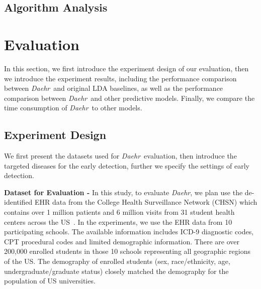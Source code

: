 \documentclass[journal,compsoc]{IEEEtran}
\newcommand{\TheName}{\mbox{\emph{Daehr}}}
\begin{document}
\subsection{Algorithm Analysis}
\section{Evaluation}\label{sec:5}
In this  section, we first introduce the experiment design of our evaluation, then we introduce the experiment results, including the performance comparison between \TheName\ and original LDA baselines, as well as the performance comparison between \TheName\ and other predictive models. Finally, we compare the time consumption of \TheName\ to other models.



\subsection{Experiment Design}
We first present the datasets used for \TheName\ evaluation, then introduce the targeted diseases for the early detection, further we specify the settings of early detection.

\textbf{Dataset for Evaluation - } In this study, to evaluate \TheName, we plan use the de-identified EHR data from the College Health Surveillance Network (CHSN) which contains over 1 million patients and 6 million visits from 31 student health centers across the US~\cite{turner_college_2015}. In the experiments, we use the EHR data from 10 participating schools. The available information includes ICD-9 diagnostic codes, CPT procedural codes and limited demographic information. There are over 200,000 enrolled students in those 10 schools representing all geographic regions of the US. The demography of enrolled students (sex, race/ethnicity, age, undergraduate/graduate status) closely matched the demography for the population of US universities.
\end{document}
